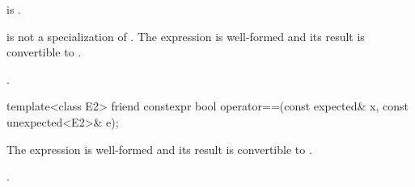 \begin{itemdescr}
\pnum
\constraints
{} is .

\pnum
\mandates
{} is not a specialization of . The expression  is well-formed and its result is convertible to .

\pnum
\returns
{}.
\end{itemdescr}

%
\begin{itemdecl}
template<class E2>
  friend constexpr bool operator==(const expected& x, const unexpected<E2>& e);
\end{itemdecl}

\begin{itemdescr}
\pnum
\mandates
The expression  is well-formed and its result is convertible to .

\pnum
\returns
{}.
\end{itemdescr}
